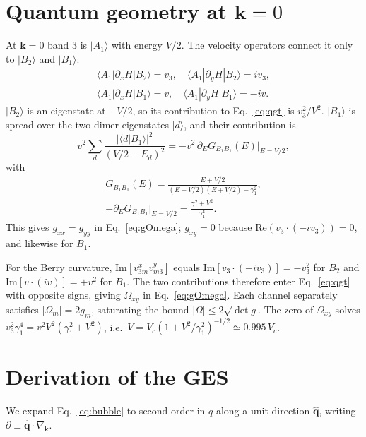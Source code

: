\documentclass[aps,prb,twocolumn,superscriptaddress,floatfix,nofootinbib]{revtex4-2}
\newcommand{\bk}{\mathbf{k}}
\begin{document}
\section{Quantum geometry at $\bk=0$}\label{app:geometry}

At $\bk=0$ band 3 is $|A_1\rangle$ with energy $V/2$. The velocity operators connect it only to $|B_2\rangle$ and $|B_1\rangle$:
\begin{gather}
\langle A_1|\partial_xH|B_2\rangle=v_3,\quad \langle A_1|\partial_yH|B_2\rangle=iv_3,\nonumber\\
\langle A_1|\partial_xH|B_1\rangle=v,\quad \langle A_1|\partial_yH|B_1\rangle=-iv .
\end{gather}
$|B_2\rangle$ is an eigenstate at $-V/2$, so its contribution to Eq.~\eqref{eq:qgt} is $v_3^2/V^2$. $|B_1\rangle$ is spread over the two dimer eigenstates $|d\rangle$, and their contribution is
\begin{equation}
v^2\sum_d\frac{|\langle d|B_1\rangle|^2}{(V/2-E_d)^2}=-v^2\,\partial_EG_{B_1B_1}(E)\Big|_{E=V/2},
\end{equation}
with
\begin{gather}
G_{B_1B_1}(E)=\frac{E+V/2}{(E-V/2)(E+V/2)-\gamma_1^2},\nonumber\\
-\partial_EG_{B_1B_1}\Big|_{E=V/2}=\frac{\gamma_1^2+V^2}{\gamma_1^4}.
\end{gather}
This gives $g_{xx}=g_{yy}$ in Eq.~\eqref{eq:gOmega}; $g_{xy}=0$ because $\mathrm{Re}(v_3\cdot(-iv_3))=0$, and likewise for $B_1$.

For the Berry curvature, $\mathrm{Im}[v^x_{3m}v^y_{m3}]$ equals $\mathrm{Im}[v_3\cdot(-iv_3)]=-v_3^2$ for $B_2$ and $\mathrm{Im}[v\cdot(iv)]=+v^2$ for $B_1$. The two contributions therefore enter Eq.~\eqref{eq:qgt} with opposite signs, giving $\Omega_{xy}$ in Eq.~\eqref{eq:gOmega}. Each channel separately satisfies $|\Omega_m|=2g_m$, saturating the bound $|\Omega|\le2\sqrt{\det g}$. The zero of $\Omega_{xy}$ solves $v_3^2\gamma_1^4=v^2V^2(\gamma_1^2+V^2)$, i.e.\ $V=V_c(1+V^2/\gamma_1^2)^{-1/2}\simeq0.995\,V_c$.

\section{Derivation of the GES}\label{app:ges}

We expand Eq.~\eqref{eq:bubble} to second order in $q$ along a unit direction $\hat{\mathbf q}$, writing $\partial\equiv\hat{\mathbf q}\cdot\nabla_{\bk}$.
\end{document}
